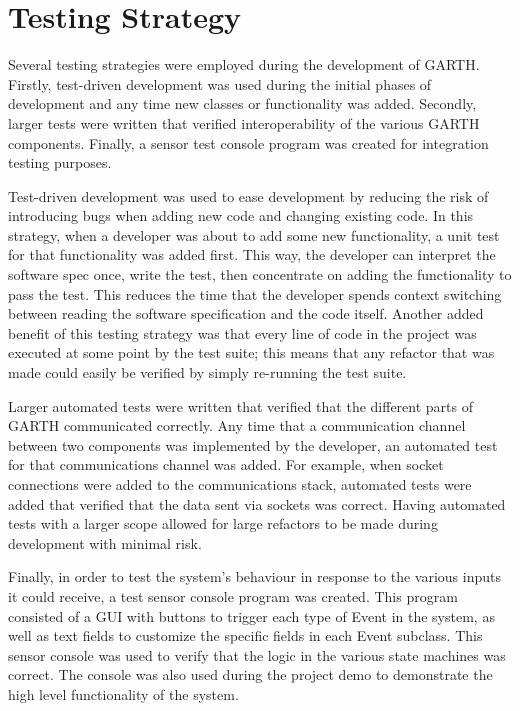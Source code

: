 \documentclass{article}
\begin{document}
\section{Testing Strategy} %

Several testing strategies were employed during the development of
GARTH. Firstly, test-driven development was used during the initial
phases of development and any time new classes or functionality was
added. Secondly, larger tests were written that verified
interoperability of the various GARTH components. Finally, a sensor
test console program was created for integration testing purposes.

Test-driven development was used to ease development by reducing the
risk of introducing bugs when adding new code and changing existing
code. In this strategy, when a developer was about to add some new
functionality, a unit test for that functionality was added
first. This way, the developer can interpret the software spec once,
write the test, then concentrate on adding the functionality to pass
the test. This reduces the time that the developer spends context
switching between reading the software specification and the code
itself. Another added benefit of this testing strategy was that every
line of code in the project was executed at some point by the test
suite; this means that any refactor that was made could easily be
verified by simply re-running the test suite.

Larger automated tests were written that verified that the different
parts of GARTH communicated correctly. Any time that a communication
channel between two components was implemented by the developer, an
automated test for that communications channel was added. For example,
when socket connections were added to the communications stack,
automated tests were added that verified that the data sent via
sockets was correct. Having automated tests with a larger scope
allowed for large refactors to be made during development with minimal
risk.

Finally, in order to test the system's behaviour in response to the
various inputs it could receive, a test sensor console program was
created. This program consisted of a GUI with buttons to trigger each
type of Event in the system, as well as text fields to customize the
specific fields in each Event subclass. This sensor console was used
to verify that the logic in the various state machines was
correct. The console was also used during the project demo to
demonstrate the high level functionality of the system.
\end{document}
